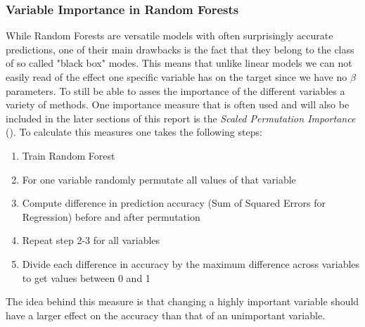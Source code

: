 \subsubsection{Variable Importance in Random Forests}
While Random Forests are versatile models with often surprisingly accurate predictions, one of their main drawbacks is the fact that they belong to the class of so called "black box" modes. This means that unlike linear models we can not easily read of the effect one specific variable has on the target since we have no $\beta$ parameters.
To still be able to asses the importance of the different variables a variety of methods. One importance measure that is often used and will also be included in the later sections of this report is the \textit{Scaled Permutation Importance} (\cite{liaw_classification_2002}). To calculate this measures one takes the following steps:
\begin{enumerate}
\item Train Random Forest
\item For one variable randomly permutate all values of that variable
\item Compute difference in prediction accuracy (Sum of Squared Errors for Regression) before and after permutation
\item Repeat step 2-3 for all variables
\item Divide each difference in accuracy by the maximum difference across variables to get values between 0  and 1
\end{enumerate}
The idea behind this measure is that changing a highly important variable should have a larger effect on the accuracy than that of an unimportant variable.